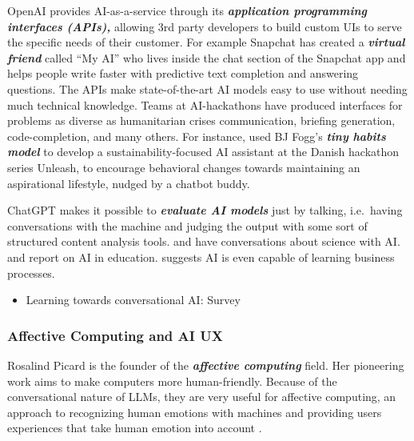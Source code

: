 \documentclass[
  letterpaper,
  DIV=11,
  numbers=noendperiod]{scrartcl}
\providecommand{\tightlist}{%
  \setlength{\itemsep}{0pt}\setlength{\parskip}{0pt}}\usepackage{longtable,booktabs,array}
\begin{document}
OpenAI provides AI-as-a-service through its \textbf{\emph{application
programming interfaces (APIs),}} allowing 3rd party developers to build
custom UIs to serve the specific needs of their customer. For example
Snapchat has created a \textbf{\emph{virtual friend}} called ``My AI''
who lives inside the chat section of the Snapchat app and helps people
write faster with predictive text completion and answering questions.
The APIs make state-of-the-art AI models easy to use without needing
much technical knowledge. Teams at AI-hackathons have produced
interfaces for problems as diverse as humanitarian crises communication,
briefing generation, code-completion, and many others. For instance,
\citep{unleashSebastianAi2017} used BJ Fogg's \textbf{\emph{tiny habits
model}} to develop a sustainability-focused AI assistant at the Danish
hackathon series Unleash, to encourage behavioral changes towards
maintaining an aspirational lifestyle, nudged by a chatbot buddy.

ChatGPT makes it possible to \textbf{\emph{evaluate AI models}} just by
talking, i.e.~having conversations with the machine and judging the
output with some sort of structured content analysis tools.
\citet{oconnorOpenArtificialIntelligence2023} and
\citet{cahanConversationChatGPTRole2023} have conversations about
science with AI. \citet{pavlikCollaboratingChatGPTConsidering2023} and
\citet{brenta.andersWhyChatGPTSuch2022} report on AI in education.
\citet{kechtQuantifyingChatbotsAbility2023} suggests AI is even capable
of learning business processes.

\begin{itemize}
\tightlist
\item
  \citet{fuLearningConversationalAI2022} Learning towards conversational
  AI: Survey
\end{itemize}

\subsubsection{Affective Computing and AI
UX}\label{affective-computing-and-ai-ux}

Rosalind Picard is the founder of the \textbf{\emph{affective
computing}} field. Her pioneering work aims to make computers more
human-friendly. Because of the conversational nature of LLMs, they are
very useful for affective computing, an approach to recognizing human
emotions with machines and providing users experiences that take human
emotion into account \citet{picardAffectiveComputing1997}.
\end{document}
